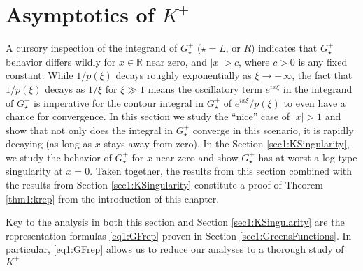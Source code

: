 \documentclass[../dissertation.tex]{subfiles}
\begin{document}
\section{Asymptotics of $K^+$}\label{sec1:AsympK}
A cursory inspection of the integrand of $G_\star^+$ ($\star = L \text{, or }R$) 
indicates that $G_\star^+$ behavior
dif{}fers wildly for $x \in \mathbb R$ near zero, and $|x| > c$, where $c>0$ is any
fixed constant. While $1/p(\xi)$ decays roughly exponentially as $\xi \to -\infty$, 
the fact that $1/p(\xi)$ decays as $1/\xi$ for $\xi \gg 1$ means the oscillatory term 
$e^{ix\xi}$ in the integrand of $G_\star^+$ is imperative for the contour 
integral in $G_\star^+$ of $e^{ix\xi} / p(\xi)$ to even have a chance for convergence.
In this section we study the ``nice'' case of $|x|>1$ and show that not only does 
the integral in $G_\star^+$ converge in this scenario, it is rapidly decaying (as long 
as $x$ stays away from zero). In the Section \ref{sec1:KSingularity}, we study
the behavior of $G_\star^+$ for $x$ near zero and show $G_\star^+$ has at worst a log 
type singularity at $x=0$. Taken together, the results from this section 
combined with the results from Section \ref{sec1:KSingularity} constitute a 
proof of Theorem \ref{thm1:krep} from the introduction of this chapter. 

Key to the analysis in both this section and Section \ref{sec1:KSingularity}
are the representation formulas \eqref{eq1:GFrep} proven in Section 
\ref{sec1:GreensFunctions}. In particular, \eqref{eq1:GFrep} allows us
to reduce our analyses to a thorough study of $K^+$
\end{document}
